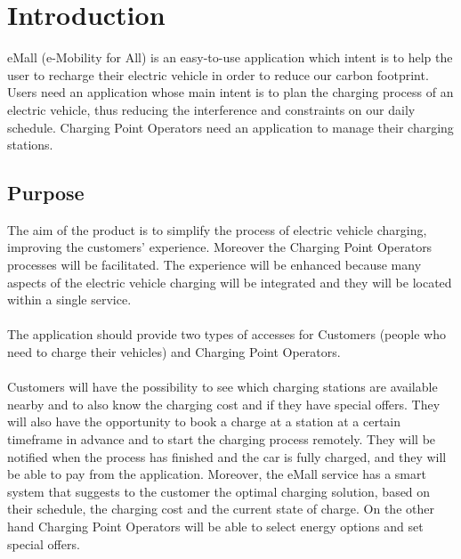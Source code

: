 \section{Introduction}
eMall (e-Mobility for All) is an easy-to-use application which intent is to help the user to recharge their electric vehicle in order to reduce our carbon footprint.
Users need an application whose main intent is to plan the charging process of an electric vehicle, thus reducing the interference and constraints on our daily schedule.
Charging Point Operators need an application to manage their charging stations. 
\subsection{Purpose}

The aim of the product is to simplify the process of electric vehicle charging, improving the customers' experience. Moreover the Charging Point Operators processes will be facilitated.
The experience will be enhanced because many aspects of the electric vehicle charging will be integrated and they will be located within a single service.
\\\\
The application should provide two types of accesses for Customers (people who need to charge their vehicles) and Charging Point Operators.
\\\\
Customers will have the possibility to see which charging stations are available nearby and to also know the charging cost and if they have special offers.
They will also have the opportunity to book a charge at a station at a certain timeframe in advance and to start the charging process remotely.
They will be notified when the process has finished and the car is fully charged, and they will be able to pay from the application.
Moreover, the eMall service has a smart system that suggests to the customer the optimal charging solution, based on their schedule, the charging cost and the current state of charge.
On the other hand Charging Point Operators will be able to select energy options and set special offers.
